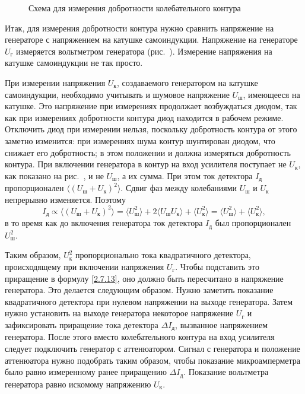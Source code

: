 \begin{figure}[h!]
    \centering\small
	\caption{Схема для измерения добротности колебательного контура}
\end{figure}

Итак, для измерения добротности контура нужно сравнить напряжение на генераторе
с напряжением на катушке самоиндукции.
Напряжение на генераторе $U_{\text{г}}$ измеряется вольтметром генератора
(рис.~). Измерение напряжения на катушке самоиндукции
не так просто.

При измерении напряжения $U_{\text{к}}$, создаваемого генератором на катушке
самоиндукции, необходимо учитывать и шумовое
напряжение $U_{\text{ш}}$, имеющееся на катушке. Это напряжение при измерениях
продолжает возбуждаться диодом, так как при
измерениях добротности контура диод находится в рабочем режиме. Отключить диод
при измерении нельзя, поскольку
добротность контура от этого заметно изменится: при измерениях шума контур
шунтирован диодом, что снижает его
добротность; в этом положении и должна измеряться добротность контура. При
включении генератора в контур на вход
усилителя поступает не $U_{\text{к}}$, как показано на рис.~, и
не $U_{\text{ш}}$, а их сумма. При этом ток детектора $I_{\text{д}}$
пропорционален
$\langle (U_{\text{ш}}+U_{\text{к}})^2\rangle$. Сдвиг фаз между колебаниями
$U_{\text{ш}}$ и $U_{\text{к}}$ непрерывно изменяется. Поэтому
\begin{equation*}
I_{\text{д}}\propto\langle (U_{\text{ш}}+U_{\text{к}})^2\rangle=\langle
U_{\text{ш}}^2\rangle+2\langle U_{\text{ш}}U_{\text{к}}\rangle+\langle
U_{\text{к}}^2\rangle=\langle U_{\text{ш}}^2\rangle+\langle
U_{\text{к}}^2\rangle,
\end{equation*}
в то время как до включения генератора ток детектора $I_{\text{д}}$ был
пропорционален $U_{\text{ш}}^2$.

Таким образом, $U_{\text{к}}^2$ пропорционально  тока
квадратичного детектора, происходящему при включении
напряжения $U_{\text{г}}$. Чтобы подставить это приращение в формулу
\eqref{2.7.13}, оно должно быть пересчитано в напряжение
генератора. Это делается следующим образом. Нужно заметить показание
квадратичного детектора при нулевом напряжении на
выходе генератора. Затем нужно установить на выходе генератора некоторое
напряжение $U_{\text{г}}$ и зафиксировать приращение
тока детектора $\Delta I_{\text{д}}$, вызванное напряжением генератора. После
этого вместо колебательного контура на вход усилителя
следует подключить генератор с аттенюатором. Сигнал с генератора и положение
аттенюатора нужно подобрать таким образом,
чтобы показание микроамперметра было равно измеренному ранее приращению $\Delta
I_{\text{д}}$. Показание вольтметра генератора равно
искомому напряжению $U_{\text{к}}$.

